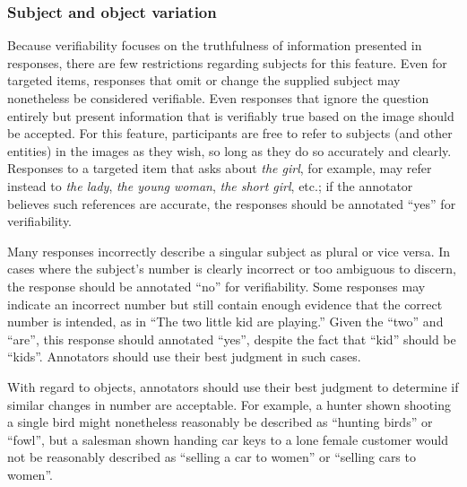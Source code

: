 \documentclass[12pt,notitlepage]{article}
\begin{document}
\subsubsection{Subject and object variation} Because verifiability focuses on the truthfulness of information presented in responses, there are few restrictions regarding subjects for this feature. Even for targeted items, responses that omit or change the supplied subject may nonetheless be considered verifiable. Even responses that ignore the question entirely but present information that is verifiably true based on the image should be accepted. For this feature, participants are free to refer to subjects (and other entities) in the images as they wish, so long as they do so accurately and clearly. Responses to a targeted item that asks about \textit{the girl}, for example, may refer instead to \textit{the lady}, \textit{the young woman}, \textit{the short girl}, etc.; if the annotator believes such references are accurate, the responses should be annotated ``yes'' for verifiability.

Many responses incorrectly describe a singular subject as plural or vice versa. In cases where the subject's number is clearly incorrect or too ambiguous to discern, the response should be annotated ``no'' for verifiability. Some responses may indicate an incorrect number but still contain enough evidence that the correct number is intended, as in ``The two little kid are playing.'' Given the ``two'' and ``are'', this response should annotated ``yes'', despite the fact that ``kid'' should be ``kids''. Annotators should use their best judgment in such cases.

With regard to objects, annotators should use their best judgment to determine if similar changes in number are acceptable. For example, a hunter shown shooting a single bird might nonetheless reasonably be described as ``hunting birds'' or ``fowl'', but a salesman shown handing car keys to a lone female customer would not be reasonably described as ``selling a car to women'' or ``selling cars to women''.
\end{document}

